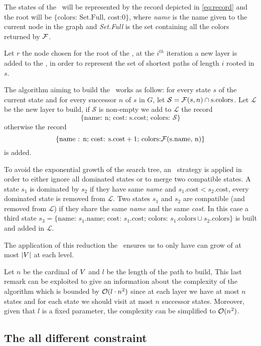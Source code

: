 The states of the \mdd\ will be represented by the record depicted in \cref{eq:record} and the root will be $\{\text{colors: Set.Full, cost:} 0\}$, where \textit{name} is the name given to the current node in the graph and \textit{Set.Full} is the set containing all the colors returned by $\mathcal{F}$.

Let $r$ the node chosen for the root of the \mdd, at the $i^{th}$ iteration a new layer is added to the \mdd, in order to represent the set of shortest paths of length $i$ rooted in $s$.

The algorithm aiming to build the \mdd\ works as follow: for every state $s$ of the current state and for every successor $n$ of $s$ in $G$, let $\mathcal{S} = \mathcal{F}(s, n) \cap \text{s.colors}$. Let $\mathcal{L}$ be the new layer to build, if $\mathcal{S}$ is non-empty we add to $\mathcal{L}$ the record
$$\{\text{name: n; cost: s.cost; colors: } \mathcal{S}\}$$ otherwise the record
$$\{\text{name : n; cost: s.cost} + 1 \text{; colors:} \mathcal{F}(\text{s.name, n})\}$$ is added.

To avoid the exponential growth of the search tree, an \adhoc\ strategy is applied in order to either ignore all dominated states or to merge two compatible states. A state $s_1$ is dominated by $s_2$ if they have same \textit{name} and $s_1.\text{cost} < s_2.\text{cost}$, every dominated state is removed from $\mathcal{L}$. Two states $s_1$ and $s_2$ are compatible (and removed from $\mathcal{L}$) if they share the same \textit{name} and the same \textit{cost}. In this case a third state $s_3 = \{\text{name: } s_1.\text{name; cost: } s_1.\text{cost; colors: } s_1.\text{colors} \cup s_2.\text{colors}\}$ is built and added in $\mathcal{L}$.

The application of this reduction the \mdd\ ensures us to only have can grow of at most $|V|$ at each level.

Let $n$ be the cardinal of $V$ and $l$ be the length of the path to build, This last remark can be exploited to give an information about the complexity of the algorithm which is bounded by $\mathcal{O}(l \cdot n^2)$ since at each layer we have at most $n$ states and for each state we should visit at most $n$ successor states. Moreover, given that $l$ is a fixed parameter, the complexity can be simplified to $\mathcal{O}(n^2)$.



\subsection{The all different constraint}

